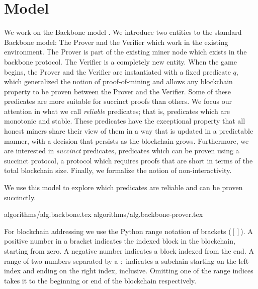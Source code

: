 \section{Model}

We work on the Backbone model \cite{backbone}. We introduce two entities to
the standard Backbone model: The Prover and the Verifier which work in the
existing environment. The Prover is part of the existing miner node which
exists in the backbone protocol. The Verifier is a completely new entity. When
the game begins, the Prover and the Verifier are instantiated with a fixed
predicate $q$, which generalized the notion of proof-of-mining and allows any
blockchain property to be proven between the Prover and the Verifier. Some of
these predicates are more suitable for succinct proofs than others. We focus
our attention in what we call \textit{ reliable} predicates; that is,
predicates which are monotonic and stable.  These predicates have the
exceptional property that all honest miners share their view of them in a way
that is updated in a predictable manner, with a decision that persists as the
blockchain grows.  Furthermore, we are interested in \textit{succinct}
predicates, predicates which can be proven using a succinct protocol, a
protocol which requires proofs that are short in terms of the total blockchain
size. Finally, we formalize the notion of non-interactivity.

We use this model to explore which predicates are reliable and can be proven
succinctly.

{algorithms/alg.backbone.tex}
{algorithms/alg.backbone-prover.tex}

For blockchain addressing we use the Python range notation of brackets ($[]$).
A positive number in a bracket indicates the indexed block in the blockchain,
starting from zero. A negative number indicates a block indexed from the end. A
range of two numbers separated by a $:$ indicates a subchain starting on the
left index and ending on the right index, inclusive. Omitting one of the range
indices takes it to the beginning or end of the blockchain respectively.
